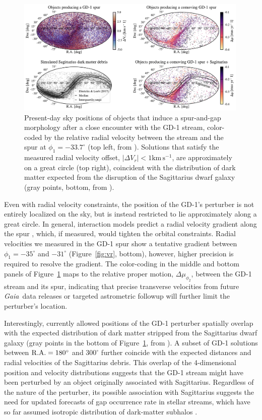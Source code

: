 \documentclass[twocolumn]{aastex63}
\newcommand{\gaia}{\textsl{Gaia}}
\newcommand{\kms}{\ensuremath{\textrm{km}\,\textrm{s}^{-1}}}
\begin{document}
\begin{figure}
\begin{center}
\includegraphics[width=0.99\textwidth]{skybox.pdf}
\end{center}
\caption{Present-day sky positions of objects that induce a spur-and-gap morphology after a close encounter with the GD-1 stream, color-coded by the relative radial velocity between the stream and the spur at $\phi_1=-33.7^\circ$ (top left, from \citealt{bonaca2019a}).
Solutions that satisfy the measured radial velocity offset, $|\Delta V_r|<1\kms$, are approximately on a great circle (top right), coincident with the distribution of dark matter expected from the disruption of the Sagittarius dwarf galaxy (gray points, bottom, from \citealt{dl2017}).
}
\label{fig:skybox}
\end{figure}

Even with radial velocity constraints, the position of the GD-1's perturber is not entirely localized on the sky, but is instead restricted to lie approximately along a great circle.
In general, interaction models predict a radial velocity gradient along the spur \citep{bonaca2019a}, which, if measured, would tighten the orbital constraints.
Radial velocities we measured in the GD-1 spur show a tentative gradient between $\phi_1=-35^\circ$ and $-31^\circ$ (Figure~\ref{fig:vr}, bottom), however, higher precision is required to resolve the gradient.
The color-coding in the middle and bottom panels of Figure~\ref{fig:skybox} maps to the relative proper motion, $\Delta\mu_{\phi_2}$, between the GD-1 stream and its spur, indicating that precise transverse velocities from future \gaia\ data releases or targeted astrometric followup will further limit the perturber's location.

Interestingly, currently allowed positions of the GD-1 perturber spatially overlap with the expected distribution of dark matter stripped from the Sagittarius dwarf galaxy (gray points in the bottom of Figure~\ref{fig:skybox}, from \citealt{dl2017}).
A subset of GD-1 solutions between $\rm R.A.=180^\circ$ and $300^\circ$ further coincide with the expected distances and radial velocities of the Sagittarius debris.
This overlap of the 4-dimensional position and velocity distributions suggests that the GD-1 stream might have been perturbed by an object originally associated with Sagittarius.
Regardless of the nature of the perturber, its possible association with Sagittarius suggests the need for updated forecasts of gap occurrence rate in stellar streams, which have so far assumed isotropic distribution of dark-matter subhalos \citep[e.g.,][]{erkal2016, banik2019}.
\end{document}
